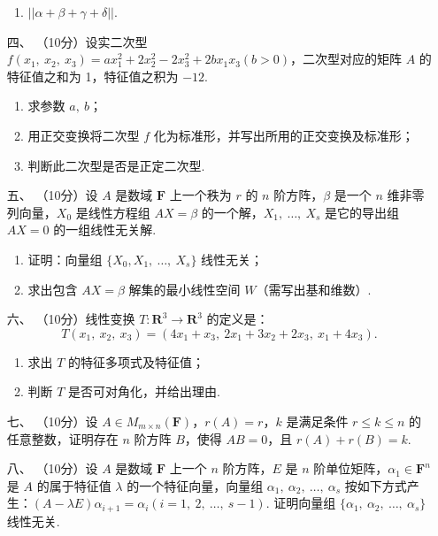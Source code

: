 \begin{enumerate}
\begin{enumerate}[label=(\arabic*)]
        \item $||\alpha+\beta+\gamma+\delta||$.
    \end{enumerate}
	\item[四、]（10分）设实二次型 $f(x_1,\ x_2,\ x_3)=ax_1^2+2x_2^2-2x_3^2+2bx_1x_3(b > 0)$，二次型对应的矩阵 $A$ 的特征值之和为 1，特征值之积为 $-12$.
    \begin{enumerate}[label=(\arabic*)]
        \item 求参数 $a,\ b$；

        \item 用正交变换将二次型 $f$ 化为标准形，并写出所用的正交变换及标准形；

        \item 判断此二次型是否是正定二次型.
    \end{enumerate}
	\item[五、]（10分）设 $A$ 是数域 $\mathbf{F}$ 上一个秩为 $r$ 的 $n$ 阶方阵，$\beta$ 是一个 $n$ 维非零列向量，$X_0$ 是线性方程组 $AX=\beta$ 的一个解，$X_1,\ \dots,\ X_s$ 是它的导出组 $AX=0$ 的一组线性无关解.
    \begin{enumerate}
        \item 证明：向量组 $\{X_0, X_1,\ \dots,\ X_s\}$ 线性无关；

        \item 求出包含 $AX=\beta$ 解集的最小线性空间 $W$（需写出基和维数）.
    \end{enumerate}
	\item[六、]（10分）线性变换 $T : \mathbf{R}^3 \to \mathbf{R}^3$ 的定义是：
    \[T(x_1,\ x_2,\ x_3)=(4x_1+x_3,\ 2x_1+3x_2+2x_3,\ x_1+4x_3).\]
    \begin{enumerate}[label=(\arabic*)]
        \item 求出 $T$ 的特征多项式及特征值；

        \item 判断 $T$ 是否可对角化，并给出理由.
    \end{enumerate}
	\item[七、]（10分）设 $A \in M_{m \times n}(\mathbf{F})$，$r(A)=r$，$k$ 是满足条件 $r \leq k \leq n$ 的任意整数，证明存在 $n$ 阶方阵 $B$，使得 $AB=0$，且 $r(A)+r(B)=k$.

    \item[八、]（10分）设 $A$ 是数域 $\mathbf{F}$ 上一个 $n$ 阶方阵，$E$ 是 $n$ 阶单位矩阵，$\alpha_1 \in \mathbf{F}^n$ 是 $A$ 的属于特征值 $\lambda$ 的一个特征向量，向量组 $\alpha_1,\ \alpha_2,\ \dots,\ \alpha_s$ 按如下方式产生：$(A-\lambda E)\alpha_{i+1}=\alpha_i(i=1,\ 2,\ \dots,\ s-1)$. 证明向量组 $\{\alpha_1,\ \alpha_2,\ \dots,\ \alpha_s\}$ 线性无关.


\end{enumerate}

